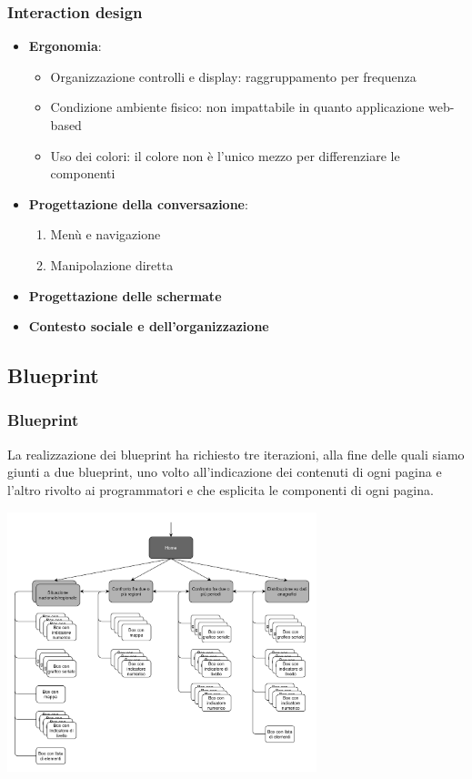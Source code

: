 \documentclass[handout]{beamer}
\begin{document}
		\begin{frame}
			\frametitle{Interaction design}		
			\begin{itemize}[<+->]
				\item \textbf{Ergonomia}:
				\begin{itemize}[<+->]
					\item Organizzazione controlli e display: raggruppamento per frequenza\\
					\item Condizione ambiente fisico: non impattabile in quanto applicazione web-based\\
					\item Uso dei colori: il colore non è l'unico mezzo per differenziare le componenti\\
				\end{itemize} 
				\item \textbf{Progettazione della conversazione}:
					\begin{enumerate}[<+->]
						\item Menù e navigazione
						\item Manipolazione diretta
					\end{enumerate}
				\item \textbf{Progettazione delle schermate}
				\item \textbf{Contesto sociale e dell'organizzazione}
			\end{itemize}
		\end{frame}

		\subsection{Blueprint}
		\begin{frame}
			\frametitle{Blueprint}
			La realizzazione dei blueprint ha richiesto  tre iterazioni, alla fine delle quali siamo giunti a due blueprint, uno volto all'indicazione dei contenuti di ogni pagina e l'altro rivolto ai programmatori e che esplicita le componenti di ogni pagina.
		\end{frame}

		\begin{frame}
			\includegraphics[width=9cm]{img/blueprint-prog-1}
		\end{frame}
\end{document}
